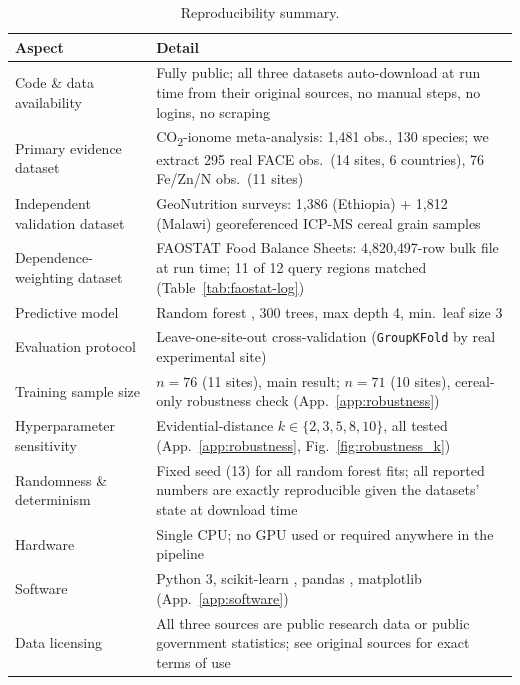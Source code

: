 \documentclass{article}
\begin{document}
\begin{table}[h]
\centering
\small
\caption{Reproducibility summary.}
\label{tab:repro-summary}
\begin{tabular}{p{}p{}}
\toprule
\textbf{Aspect} & \textbf{Detail} \\
\midrule
Code \& data availability & Fully public; all three datasets auto-download at run time from their original sources, no manual steps, no logins, no scraping \\
Primary evidence dataset & \citet{loladze2014hidden} CO\textsubscript{2}-ionome meta-analysis: 1{,}481 obs., 130 species; we extract 295 real FACE obs.\ (14 sites, 6 countries), 76 Fe/Zn/N obs.\ (11 sites) \\
Independent validation dataset & \citet{kumssa2022geonutrition} GeoNutrition surveys: 1{,}386 (Ethiopia) + 1{,}812 (Malawi) georeferenced ICP-MS cereal grain samples \\
Dependence-weighting dataset & FAOSTAT Food Balance Sheets: 4{,}820{,}497-row bulk file at run time; 11 of 12 query regions matched (Table~\ref{tab:faostat-log}) \\
Predictive model & Random forest \citep{breiman2001random}, 300 trees, max depth 4, min.\ leaf size 3 \\
Evaluation protocol & Leave-one-site-out cross-validation (\texttt{GroupKFold} by real experimental site) \\
Training sample size & $n=76$ (11 sites), main result; $n=71$ (10 sites), cereal-only robustness check (App.~\ref{app:robustness}) \\
Hyperparameter sensitivity & Evidential-distance $k \in \{2,3,5,8,10\}$, all tested (App.~\ref{app:robustness}, Fig.~\ref{fig:robustness_k}) \\
Randomness \& determinism & Fixed seed (13) for all random forest fits; all reported numbers are exactly reproducible given the datasets' state at download time \\
Hardware & Single CPU; no GPU used or required anywhere in the pipeline \\
Software & Python 3, scikit-learn \citep{pedregosa2011scikit}, pandas \citep{mckinney2010data}, matplotlib \citep{hunter2007matplotlib} (App.~\ref{app:software}) \\
Data licensing & All three sources are public research data or public government statistics; see original sources for exact terms of use \\
\bottomrule
\end{tabular}
\end{table}
\end{document}
